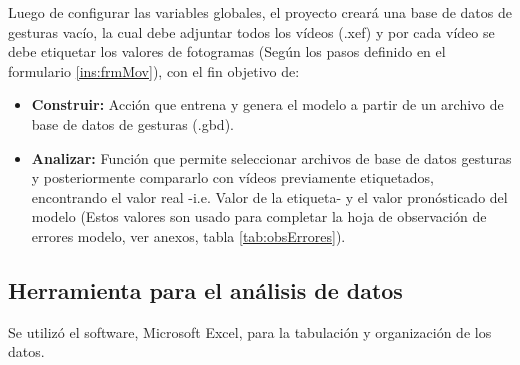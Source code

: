 Luego de configurar las variables globales, el proyecto crear\'a una base de datos de gesturas vac\'io, la cual debe adjuntar todos los v\'ideos (.xef)  y por cada v\'ideo se debe etiquetar los valores de fotogramas (Seg\'un los pasos definido en el formulario \ref{ins:frmMov}), con el fin objetivo de: 
\begin{itemize}
\item \textbf{Construir:} Acci\'on que entrena y genera el modelo a partir de un archivo de base de datos de gesturas (.gbd).
\item \textbf{Analizar:} Funci\'on que permite seleccionar archivos de base de datos gesturas y posteriormente compararlo con v\'ideos previamente etiquetados, encontrando el valor real -i.e. Valor de la etiqueta- y el valor pron\'osticado del modelo (Estos valores son usado para completar la hoja de observaci\'on de errores modelo, ver anexos, tabla \ref{tab:obsErrores}).
\end{itemize}
\subsection{Herramienta para el an\'alisis de datos} \label{ins:toolsAn}
Se utiliz\'o el software, Microsoft Excel, para la tabulaci\'on y organizaci\'on de los datos.